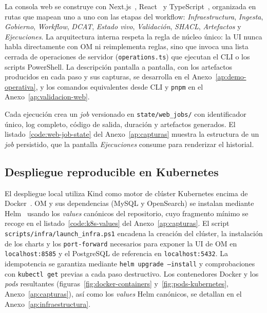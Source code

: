 La consola web se construye con Next.js~\cite{nextjsDocs}, React~\cite{reactDocs} y TypeScript~\cite{typescriptHandbook}, organizada en rutas que mapean uno a uno con las etapas del workflow: \emph{Infraestructura}, \emph{Ingesta}, \emph{Gobierno}, \emph{Workflow}, \emph{DCAT}, \emph{Estado vivo}, \emph{Validación}, \emph{SHACL}, \emph{Artefactos} y \emph{Ejecuciones}. La arquitectura interna respeta la regla de núcleo único: la \ac{UI} nunca habla directamente con \ac{OM} ni reimplementa reglas, sino que invoca una lista cerrada de operaciones de servidor (\texttt{operations.ts}) que ejecutan el \ac{CLI} o los scripts PowerShell. La descripción pantalla a pantalla, con los artefactos producidos en cada paso y sus capturas, se desarrolla en el Anexo~\ref{ap:demo-operativa}, y los comandos equivalentes desde \ac{CLI} y \texttt{pnpm} en el Anexo~\ref{ap:validacion-web}.

Cada ejecución crea un \emph{job} versionado en \texttt{state/web\_jobs/} con identificador único, log completo, código de salida, duración y artefactos generados. El listado~\ref{code:web-job-state} del Anexo~\ref{ap:capturas} muestra la estructura de un \emph{job} persistido, que la pantalla \emph{Ejecuciones} consume para renderizar el historial.

\subsection{Despliegue reproducible en Kubernetes}\label{sec:implementacion-k8s}

El despliegue local utiliza Kind como motor de clúster Kubernetes encima de Docker~\cite{dockerOverview, kindDocs, kubernetesConcepts}. \ac{OM} y sus dependencias (MySQL y OpenSearch) se instalan mediante Helm~\cite{helmDocs} usando los \emph{values} canónicos del repositorio, cuyo fragmento mínimo se recoge en el listado~\ref{code:k8s-values} del Anexo~\ref{ap:capturas}. El script \texttt{scripts/infra/launch\_infra.ps1} encadena la creación del clúster, la instalación de los charts y los \texttt{port-forward} necesarios para exponer la \ac{UI} de \ac{OM} en \texttt{localhost:8585} y el PostgreSQL de referencia en \texttt{localhost:5432}. La idempotencia se garantiza mediante \texttt{helm upgrade --install} y comprobaciones con \texttt{kubectl get} previas a cada paso destructivo. Los contenedores Docker y los \emph{pods} resultantes (figuras~\ref{fig:docker-containers} y~\ref{fig:pods-kubernetes}, Anexo~\ref{ap:capturas}), así como los \emph{values} Helm canónicos, se detallan en el Anexo~\ref{ap:infraestructura}.

